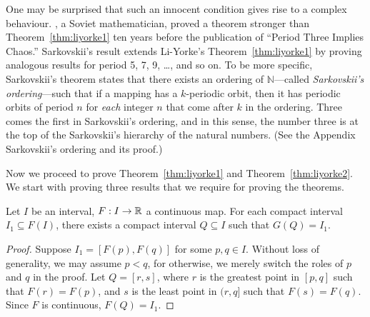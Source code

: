 \documentclass[12pt,draft,twoside]{book}
\begin{document}
One may be surprised that such an innocent condition gives rise to a complex behaviour.
\citet{sarkovskii}, a Soviet mathematician, proved a theorem stronger than Theorem~\ref{thm:liyorke1} ten years before the publication of ``Period Three Implies Chaos.''
Sarkovskii's result extends Li-Yorke's Theorem~\ref{thm:liyorke1} by proving analogous results for period 5, 7, 9, \ldots, and so on.
To be more specific, Sarkovskii's theorem states that there exists an ordering of $\mathbb{N}$---called \textit{Sarkovskii's ordering}---such that if a mapping has a $k$-periodic orbit, then it has periodic orbits of period $n$ for \textit{each} integer $n$ that come after $k$ in the ordering.
Three comes the first in Sarkovskii's ordering, and in this sense, the number three is at the top of the Sarkovskii's hierarchy of the natural numbers.
(See the Appendix Sarkovskii's ordering and its proof.)

Now we proceed to prove Theorem~\ref{thm:liyorke1} and Theorem~\ref{thm:liyorke2}.
We start with proving three results that we require for proving the theorems.

\begin{proposition}
  Let $I$ be an interval, $F: I \to \mathbb{R}$ a continuous map.
  For each compact interval $I_1 \subseteq F(I)$, there exists a compact interval $Q \subseteq I$ such that $G(Q) = I_1$.
  \label{prop:liyorke1}
  \begin{proof}
    Suppose $I_1 = [F(p),F(q)]$ for some $p,q \in I$.
    Without loss of generality, we may assume $p < q$, for otherwise, we merely switch the roles of $p$ and $q$ in the proof.
    Let $Q = [r,s]$, where $r$ is the greatest point in $[p,q]$ such that $F(r) = F(p)$, and $s$ is the least point in $(r,q]$ such that $F(s) = F(q)$.
    Since $F$ is continuous, $F(Q) = I_1$.
  \end{proof}
\end{proposition}
\end{document}
